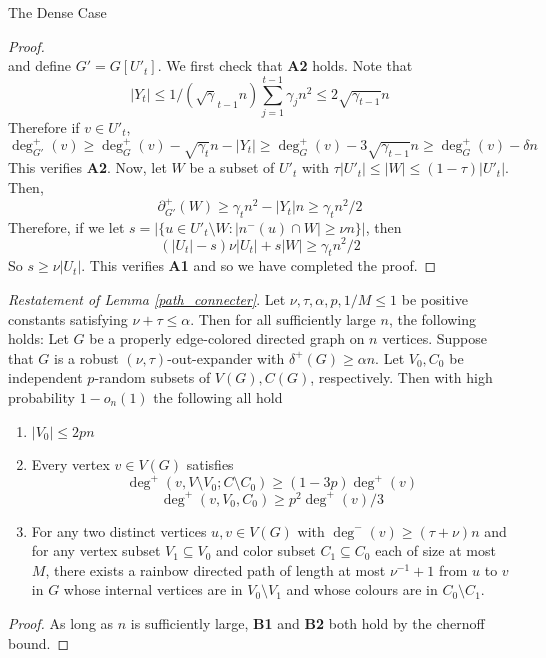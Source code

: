 \documentclass[11pt,a4paper]{article}
\begin{document}
\begin{section}{The Dense Case}
\begin{proof}
\[\]
and define $G' = G[U'_t]$. We first check that \textbf{A2} holds. Note that
\[
|Y_t| \leq 1/(\sqrt \gamma_{t-1} n) \sum_{j = 1}^{t - 1} \gamma_j n^2 \leq 2 \sqrt{ \gamma_{t - 1}} n
\]
Therefore if $v \in U'_t$,
\[
\deg_{G'}^+ (v) \geq \deg_G^+ (v) - \sqrt{\gamma_t} n - |Y_t| \geq \deg_G^+(v) - 3 \sqrt{\gamma_{t- 1} }n \geq \deg_G^+(v) - \delta n
\]
This verifies \textbf{A2}. Now, let $W$ be a subset of $U'_t$ with $ \tau |U'_t| \leq |W| \leq (1 - \tau) |U'_t|$. Then,
\[
\partial_{G'}^+ (W) \geq \gamma_t n^2 - |Y_t| n \geq \gamma_t n^2/2
\]
Therefore, if we let $s = |\{u \in U'_t \setminus W : | n^{-} (u) \cap W | \geq \nu n \}| $, then
\[
(|U_t| - s) \nu |U_t| + s |W| \geq \gamma_t n^2 /2
\]
So $s \geq \nu |U_t|$. This verifies \textbf{A1} and so we have completed the proof.

\end{proof}
\medskip
\medskip
\medskip

\textit{Restatement of Lemma \ref {path_connecter}}. Let $\nu, \tau, \alpha, p, 1/M \leq 1$ be positive constants satisfying $\nu + \tau \leq \alpha$. Then for all sufficiently large $n$, the following holds: Let $G$ be a properly edge-colored directed graph on $n$ vertices. Suppose that $G$ is a robust $(\nu, \tau)$-out-expander with $\delta^+(G) \geq \alpha n$. Let $V_0, C_0$ be independent $p$-random subsets of $V(G), C(G)$, respectively. Then with high probability $1 - o_n(1)$ the following all hold
\begin{enumerate}
\item[ \textbf{B1}] $|V_0| \leq 2pn$
\item[ \textbf{B2}] Every vertex $v \in V(G)$ satisfies
\[
\deg^+ (v, V \setminus V_0 ; C \setminus C_0 ) \geq (1 - 3p) \deg^+(v)
\]
\[
\deg^{+} (v, V_0, C_0) \geq  p^2 \deg^{+}(v)/3
\]

\item[ \textbf{B3}] For any two distinct vertices $u, v \in V(G)$ with $\deg^{-}(v) \geq  (\tau + \nu) n$ and for any vertex subset $V_1 \subseteq V_0$ and color subset $C_1 \subseteq C_0$ each of size at most $M$, there exists a rainbow directed path of length at most $\nu^{-1} + 1$ from $u$ to $v$ in $G$ whose internal vertices are in $V_0 \setminus V_1$ and whose colours are in $C_0 \setminus C_1$.
\end{enumerate}
\begin{proof} As long as $n$ is sufficiently large, \textbf{B1} and \textbf{B2} both hold by the chernoff bound.

\medskip


\end{proof}
\end{section}
\end{document}
